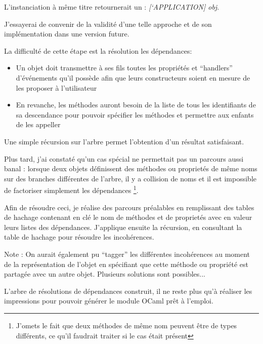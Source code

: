 L'instanciation à même titre retournerait un : \emph{[`APPLICATION] obj}.

J'essayerai de convenir de la validité d'une telle approche et de son implémentation dans une 
version future.




La difficulté de cette étape est la résolution les dépendances:
\begin{itemize}
\item Un objet doit transmettre à ses fils toutes les propriétés et ``handlers'' d'événements 
  qu'il possède afin que leurs constructeurs soient en mesure de les proposer à l'utilisateur
\item En revanche, les méthodes auront besoin de la liste de tous les identifiants de sa descendance pour
  pouvoir spécifier les méthodes et permettre aux enfants de les appeller
\end{itemize}\smallskip

Une simple récursion sur l'arbre permet l'obtention d'un résultat satisfaisant.

Plus tard, j'ai constaté qu'un cas spécial ne permettait pas un parcours aussi banal :
lorsque deux objets définissent des méthodes ou proprietés de même noms sur des branches différentes
de l'arbre, il y a collision de noms et il est impossible de factoriser simplement les dépendances
\footnote{J'omets le fait que deux méthodes de même nom peuvent être de types différents, 
ce qu'il faudrait traiter si le cas était présent}.

Afin de résoudre ceci, je réalise des parcours préalables en remplissant des tables de hachage contenant
en clé le nom de méthodes et de proprietés avec en valeur leurs listes des dépendances.
J'applique ensuite la récursion, en consultant la table de hachage pour résoudre les incohérences.

Note : On aurait également pu ``tagger'' les différentes incohérences au moment de la représentation de l'objet
en spécifiant que cette méthode ou propriété est partagée avec un autre objet. Plusieurs solutions sont
possibles...\medskip

L'arbre de résolutions de dépendances construit, il ne reste plus qu'à réaliser les impressions
pour pouvoir générer le module OCaml prêt à l'emploi.
